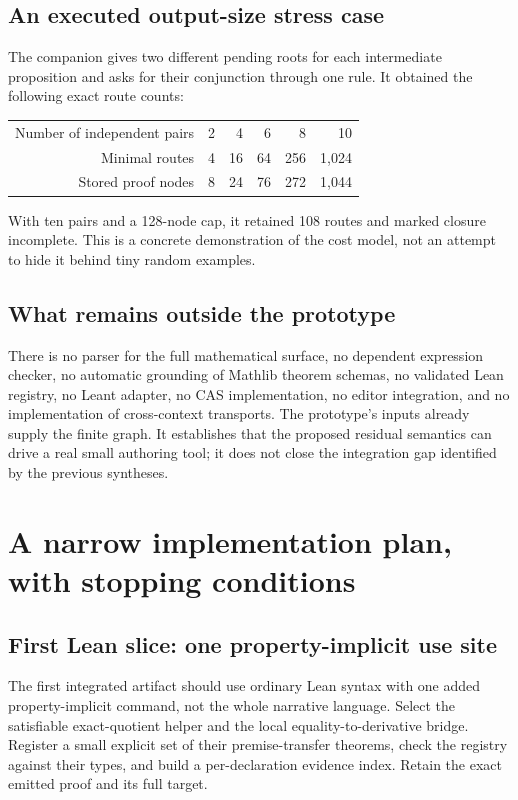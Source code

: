 \documentclass[11pt,a4paper]{article}
\theoremstyle{definition}
\theoremstyle{remark}
\newcommand{\code}[1]{\texttt{\detokenize{#1}}}
\begin{document}
\subsection{An executed output-size stress case}
The companion \code{stress_frontiers.py} gives two different pending roots for
each intermediate proposition and asks for their conjunction through one rule.
It obtained the following exact route counts:
\begin{center}\small
\begin{tabular}{@{}rrrrrr@{}}
\toprule
Number of independent pairs & 2 & 4 & 6 & 8 & 10\\
Minimal routes & 4 & 16 & 64 & 256 & 1,024\\
Stored proof nodes & 8 & 24 & 76 & 272 & 1,044\\
\bottomrule
\end{tabular}
\end{center}
With ten pairs and a 128-node cap, it retained 108 routes and marked closure
incomplete. This is a concrete demonstration of the cost model, not an attempt
to hide it behind tiny random examples.

\subsection{What remains outside the prototype}
There is no parser for the full mathematical surface, no dependent expression
checker, no automatic grounding of Mathlib theorem schemas, no validated Lean
registry, no Leant adapter, no CAS implementation, no editor integration, and
no implementation of cross-context transports. The prototype's inputs already
supply the finite graph. It establishes that the proposed residual semantics
can drive a real small authoring tool; it does not close the integration gap
identified by the previous syntheses.

\section{A narrow implementation plan, with stopping conditions}
\label{sec:plan}

\subsection{First Lean slice: one property-implicit use site}
The first integrated artifact should use ordinary Lean syntax with one added
property-implicit command, not the whole narrative language. Select the
satisfiable exact-quotient helper and the local equality-to-derivative bridge.
Register a small explicit set of their premise-transfer theorems, check the
registry against their types, and build a per-declaration evidence index.
Retain the exact emitted proof and its full target.
\end{document}
